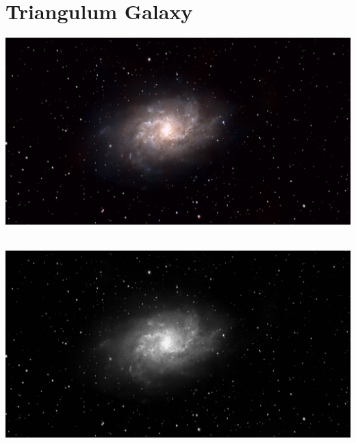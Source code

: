 {\footnotesize\color{white}


}\ \\
\begin{center}
\end{center}
\ \\\section{Triangulum Galaxy}
\includegraphics[width=\textwidth]{../Imaging//Original/Triangulum_Galaxy.jpg}
{\footnotesize\color{white}


}\ \\
\includegraphics[width=\textwidth]{../Imaging//Grayscale/Triangulum_Galaxy.jpg}
